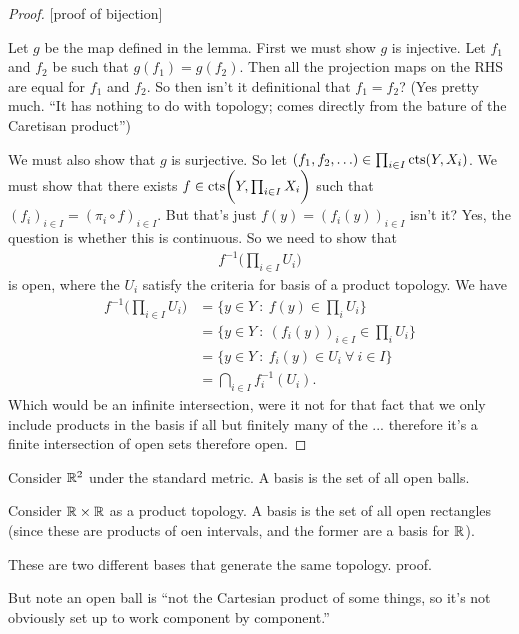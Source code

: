 \begin{proof}

  [proof of bijection]

  Let $g$ be the map defined in the lemma. First we must show $g$ is injective. Let $f_1$ and $f_2$
  be such that $g(f_1) = g(f_2)$. Then all the projection maps on the RHS are equal for $f_1$
  and $f_2$. So then isn't it definitional that $f_1 = f_2$? (Yes pretty much. ``It has nothing to
  do with topology; comes directly from the bature of the Caretisan product​'')

  We must also show that $g$ is surjective. So
  let $(f_1, f_2, \ldots) \in \prod_{i \in I} \text{cts}(Y, X_i)$. We must show that there
  exists $f \in \text{cts}\bigg(Y, \prod_{i \in I} X_i\bigg)$ such
  that $(f_i)_{i \in I} = (\pi_i \circ f)_{i \in I}$. But that's just $f(y) = (f_i(y))_{i \in I}$
  isn't it? Yes, the question is whether this is continuous. So we need to show that
  \begin{align*}
    f^{-1}\bigg(\prod_{i \in I} U_i\bigg)
  \end{align*}
  is open, where the $U_i$ satisfy the criteria for basis of a product topology.
  We have
  \begin{align*}
    f^{-1}\bigg(\prod_{i \in I} U_i\bigg)
    &= \{y \in Y ~:~ f(y) \in \prod_i U_i\} \\
    &= \{y \in Y ~:~ (f_i(y))_{i \in I} \in \prod_i U_i\} \\
    &= \{y \in Y ~:~ f_i(y) \in U_i ~ \forall~ i \in I\} \\
    &= \bigcap_{i \in I} f_i^{-1}(U_i).
  \end{align*}
  Which would be an infinite intersection, were it not for that fact that we only include products
  in the basis if all but finitely many of the ... therefore it's a finite intersection of open
  sets therefore open.
\end{proof}

\begin{example}
  Consider $\mathbb{R}^2$ under the standard metric. A basis is the set of all open balls.

  Consider $\mathbb{R} \times \mathbb{R}$ as a product topology. A basis is the set of all open rectangles (since
  these are products of oen intervals, and the former are a basis for $\mathbb{R}$).

  These are two different bases that generate the same topology.  proof.

  But note an open ball is ``not the Cartesian product of some things, so it's not obviously set up
  to work component by component.​''
\end{example}



